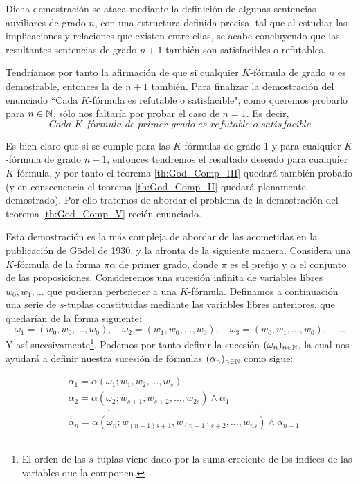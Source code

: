 Dicha demostración se ataca mediante la definición de algunas sentencias auxiliares de grado $n$, con una estructura definida precisa, tal que al estudiar las implicaciones 
y relaciones que existen entre ellas, se acabe concluyendo que las resultantes sentencias de grado $n+1$ también son satisfacibles o refutables. 

Tendríamos por tanto la afirmación de que si cualquier $K$-fórmula de grado $n$ es demostrable, entonces la de $n+1$ también. Para finalizar la demostración del enunciado
``Cada $K$-fórmula es refutable o satisfacible", como queremos probarlo para $n \in \mathbb{N}$, sólo nos faltaría por probar el caso de $n=1$. Es decir,
\begin{equation}\label{th:God_Comp_V}
    \textit{Cada $K$-fórmula de primer grado es refutable o satisfacible}
\end{equation}

Es bien claro que si se cumple para las $K$-fórmulas de grado 1 y para cualquier $K$-fórmula de grado $n+1$, entonces tendremos el resultado deseado para cualquier $K$-fórmula, y por tanto
el teorema \eqref{th:God_Comp_III} quedará también probado (y en consecuencia el teorema \eqref{th:God_Comp_II} quedará plenamente demostrado). Por ello tratemos de abordar el problema de la 
demostración del teorema \eqref{th:God_Comp_V} recién enunciado.

Esta demostración es la más compleja de abordar de las acometidas en la publicación de Gödel de 1930, y la afronta de la siguiente manera. Considera una $K$-fórmula de la forma $\pi \alpha$
de primer grado, donde $\pi$ es el prefijo y $\alpha$ el conjunto de las proposiciones. Consideremos una sucesión infinita de variables libres $w_0, w_1, \dots $ que pudieran pertenecer a una $K$-fórmula.
Definamos a continuación una serie de $s$-tuplas constituidas mediante las variables libres anteriores, que quedarían de la forma siguiente:
$$\omega_1 = (w_0, w_0, \dots, w_0), \quad \omega_2 = (w_1, w_0, \dots, w_0), \quad \omega_3 = (w_0, w_1, \dots, w_0), \quad \dots$$
Y así sucesivamente\footnote{El orden de las $s$-tuplas viene dado por la suma creciente de los índices de las variables que la componen.}. Podemos por tanto definir la sucesión $(\omega_n)_{n \in \mathbb{N}}$, 
la cual nos ayudará a definir nuestra sucesión de fórmulas $(\alpha_n)_{n \in \mathbb{N}}$ como sigue:

\begin{equation*}
    \begin{aligned}
        &\alpha_1 = \alpha(\omega_1; w_1, w_2, \dots, w_s) \\
        &\alpha_2 = \alpha(\omega_{2}; w_{s+1}, w_{s+2}, \dots, w_{2s}) \land \alpha_1 \\
        &\qquad \qquad \dots\\ 
        &\alpha_n = \alpha(\omega_{n}; w_{(n-1)s+1}, w_{(n-1)s+2}, \dots, w_{ns}) \land \alpha_{n-1}
    \end{aligned}
\end{equation*}

